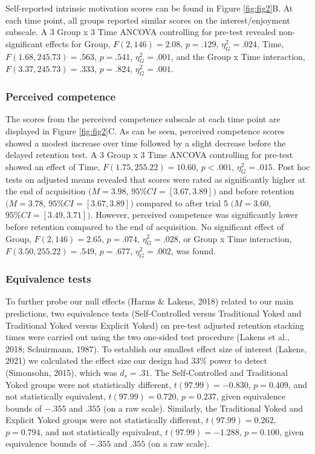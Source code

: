\documentclass[
  english,
  jou]{apa7}
\begin{document}
Self-reported intrinsic motivation scores can be found in Figure \ref{fig:fig2}B. At each time point, all groups reported similar scores on the interest/enjoyment subscale. A 3 Group x 3 Time ANCOVA controlling for pre-test revealed non-significant effects for Group, \(F(2,146) = 2.08\), \(p = .129\), \(\eta^2_{G} = .024\), Time, \(F(1.68,245.73) = .563\), \(p = .541\), \(\eta^2_{G} = .001\), and the Group x Time interaction, \(F(3.37,245.73) = .333\), \(p = .824\), \(\eta^2_{G} = .001\).

\hypertarget{perceived-competence}{%
\subsubsection{Perceived competence}\label{perceived-competence}}

The scores from the perceived competence subscale at each time point are displayed in Figure \ref{fig:fig2}C. As can be seen, perceived competence scores showed a modest increase over time followed by a slight decrease before the delayed retention test. A 3 Group x 3 Time ANCOVA controlling for pre-test showed an effect of Time, \(F(1.75,255.22) = 10.60\), \(p < .001\), \(\eta^2_{G} = .015\). Post hoc tests on adjusted means revealed that scores were rated as significantly higher at the end of acquisition \((M = 3.98\), \(95\%CI = [3.67,3.89])\) and before retention \((M = 3.78\), \(95\%CI = [3.67,3.89])\) compared to after trial 5 \((M = 3.60\), \(95\%CI = [3.49,3.71])\). However, perceived competence was significantly lower before retention compared to the end of acquisition. No significant effect of Group, \(F(2,146) = 2.65\), \(p = .074\), \(\eta^2_{G} = .028\), or Group x Time interaction, \(F(3.50,255.22) = .549\), \(p = .677\), \(\eta^2_{G} = .002\), was found.

\hypertarget{equivalence-tests}{%
\subsubsection{Equivalence tests}\label{equivalence-tests}}

To further probe our null effects (Harms \& Lakens, 2018) related to our main predictions, two equivalence tests (Self-Controlled versus Traditional Yoked and Traditional Yoked versus Explicit Yoked) on pre-test adjusted retention stacking times were carried out using the two one-sided test procedure (Lakens et al., 2018; Schuirmann, 1987). To establish our smallest effect size of interest (Lakens, 2021) we calculated the effect size our design had 33\% power to detect (Simonsohn, 2015), which was \(d_{s} = .31\). The Self-Controlled and Traditional Yoked groups were not statistically different, \(t(97.99) = -0.830\), \(p = 0.409\), and not statistically equivalent, \(t(97.99) = 0.720\), \(p = 0.237\), given equivalence bounds of \(-.355\) and \(.355\) (on a raw scale). Similarly, the Traditional Yoked and Explicit Yoked groups were not statistically different, \(t(97.99) = 0.262\), \(p = 0.794\), and not statistically equivalent, \(t(97.99) = -1.288\), \(p = 0.100\), given equivalence bounds of \(-.355\) and \(.355\) (on a raw scale).
\end{document}

